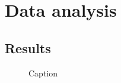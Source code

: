\documentclass[main.tex]{subfiles}
\begin{document}
\section{Data analysis}


\subsection{Results}


\begin{figure}[H]
    \centering
    
    \caption{Caption}
    \label{fig:placeholder}
\end{figure}
\end{document}

